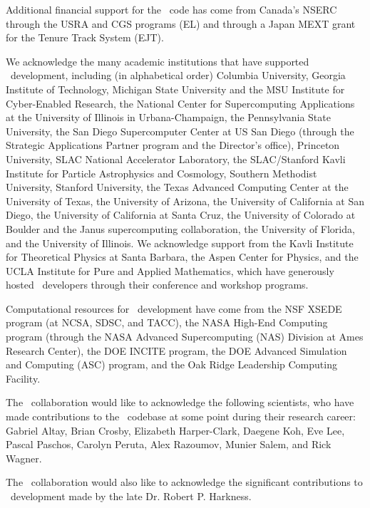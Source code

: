 Additional financial support for the \enzo\ code has come from
Canada's NSERC through the USRA and CGS programs (EL) and through a 
Japan MEXT grant for the Tenure Track System (EJT).

We acknowledge the  many academic institutions that have supported \enzo\
development, including (in alphabetical order)
Columbia University,
Georgia Institute of Technology,
Michigan State University and the MSU Institute for Cyber-Enabled
Research, 
the National Center for Supercomputing Applications at the University
of Illinois in Urbana-Champaign, 
the Pennsylvania State University,
the San Diego Supercomputer Center at US San Diego (through the Strategic Applications
Partner program and the Director’s office),
Princeton University,
SLAC National Accelerator Laboratory,
the SLAC/Stanford Kavli Institute for Particle
Astrophysics and Cosmology,  
Southern Methodist University,
Stanford University,
the Texas Advanced Computing Center at the University of Texas,
the University of Arizona,
the University of California at San Diego, 
the University of California at Santa Cruz,
the University of Colorado at Boulder and the Janus supercomputing collaboration,
the University of Florida,
and the University of Illinois.
We acknowledge support from the Kavli Institute for Theoretical
Physics at Santa Barbara, the Aspen Center for Physics, and the UCLA
Institute for Pure and Applied Mathematics, which have
generously hosted \enzo\ developers through their conference and
workshop programs.

Computational resources for \enzo\ development have come from the NSF
XSEDE program (at NCSA, SDSC, and TACC), the NASA High-End Computing program (through the NASA Advanced Supercomputing (NAS) Division at Ames Research Center), the DOE INCITE
program, the DOE Advanced Simulation and Computing (ASC) program, and
the Oak Ridge Leadership Computing Facility.

The \enzo\ collaboration would like to acknowledge the following
scientists, who have made contributions to the \enzo\ codebase at some
point during their research career: Gabriel Altay, Brian Crosby,
Elizabeth Harper-Clark, Daegene Koh, Eve Lee, Pascal Paschos, Carolyn
Peruta, Alex Razoumov, Munier Salem, and Rick Wagner.

The \enzo\ collaboration would also like to acknowledge the significant contributions to
\enzo\ development made by the late Dr. Robert P. Harkness. 

